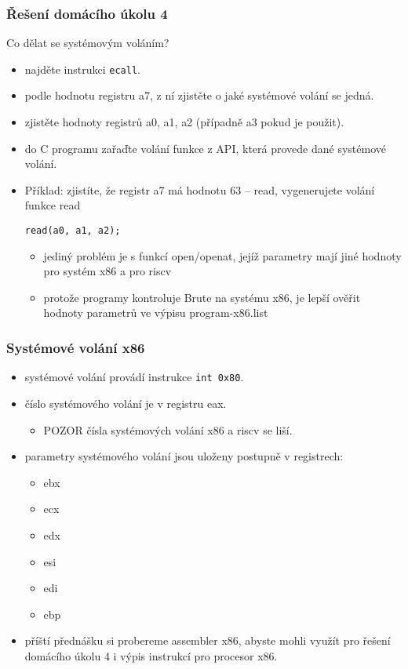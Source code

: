 \documentclass{beamer}
\begin{document}
\begin{frame}[fragile]
\frametitle{Řešení domácího úkolu 4}

Co dělat se systémovým voláním?
\begin{itemize}
\item najděte instrukci \texttt{ecall}.
\item podle hodnotu registru a7, z ní zjistěte o jaké systémové volání se jedná.
\item zjistěte hodnoty registrů a0, a1, a2 (případně a3 pokud je použit).
\item do C programu zařaďte volání funkce z API, která provede dané systémové volání.
\item Příklad: zjistíte, že registr a7 má hodnotu 63 -- read, vygenerujete volání funkce read
\begin{verbatim}
read(a0, a1, a2);
\end{verbatim}
\begin{itemize}
 \item jediný problém je s funkcí open/openat, jejíž parametry mají jiné hodnoty pro systém x86 a pro riscv
 \item protože programy kontroluje Brute na systému x86, je lepší ověřit hodnoty parametrů ve výpisu program-x86.list
 \end{itemize}
\end{itemize}
\end{frame}

\begin{frame}
\frametitle{Systémové volání x86}

\begin{itemize}
\item systémové volání provádí instrukce \texttt{int 0x80}.
\item číslo systémového volání je v registru eax.
 \begin{itemize}
 \item POZOR čísla systémových volání x86 a riscv se liší.
 \end{itemize}
\item parametry systémového volání jsou uloženy postupně v registrech:
 \begin{itemize}
 \item ebx 
 \item ecx 
 \item edx 
 \item esi 
 \item edi 
 \item ebp 
 \end{itemize}
\item příští přednášku si probereme assembler x86, abyste mohli využít pro řešení domácího úkolu 4 i výpis instrukcí pro procesor x86.
\end{itemize}
\end{frame}
\end{document}
